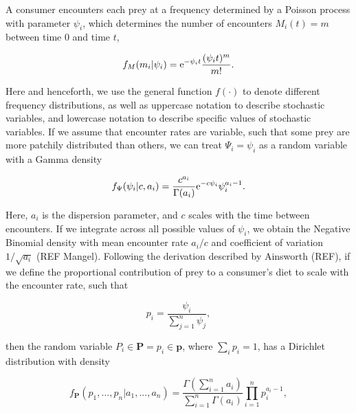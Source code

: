 \documentclass{frontiersSCNS}
\begin{document}
A consumer encounters each prey at a frequency determined by a Poisson process with parameter $\psi_i$, which determines the number of encounters $M_i(t)=m$ between time 0 and time $t$,

\begin{equation}
f_M (m_i|\psi_i) = {\rm e}^{-\psi_i t}\frac{(\psi_i t)^m}{m!}.
\end{equation}

\noindent Here and henceforth, we use the general function $f(\cdot)$ to denote different frequency distributions, as well as uppercase notation to describe stochastic variables, and lowercase notation to describe specific values of stochastic variables.
If we assume that encounter rates are variable, such that some prey are more patchily distributed than others, we can treat $\Psi_i = \psi_i$ as a random variable with a Gamma density

\begin{equation}
f_\Psi (\psi_i | c, a_i) = \frac{c^{a_i}}{\Gamma (a_i)}{\rm e}^{-c \psi_i}\psi_i^{a_i - 1}.
\end{equation}

\noindent Here, $a_i$ is the dispersion parameter, and $c$ scales with the time between encounters.
If we integrate across all possible values of $\psi_i$, we obtain the Negative Binomial density with mean encounter rate $a_i/c$ and coefficient of variation $1/\sqrt{a_i}$ (REF Mangel).
Following the derivation described by Ainsworth (REF), if we define the proportional contribution of prey to a consumer's diet to scale with the encounter rate, such that

\begin{equation}
  p_i = \frac{\psi_i}{\sum_{j=1}^n \psi_j},
\end{equation}

\noindent then the random variable $P_i \in {\bm P} = p_i \in {\bm p}$, where $\sum_i p_i = 1$, has a Dirichlet distribution with density

\begin{equation}
  f_{\bm P}(p_1,...,p_n|a_1,...,a_n) = \frac{\Gamma(\sum_{i=1}^n a_i)}{\sum_{i=1}^n\Gamma(a_i)}\prod_{i=1}^n p_i^{a_i - 1},
\end{equation}
\end{document}

